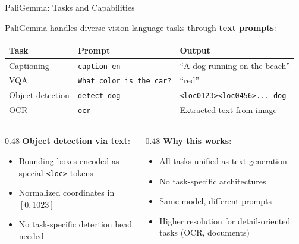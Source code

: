\begin{frame}{PaliGemma: Tasks and Capabilities}

  PaliGemma handles diverse vision-language tasks through \textbf{text prompts}:

  \vspace{0.3em}
  \begin{center}
  \small
  \begin{tabular}{l l l}
    \toprule
    \textbf{Task} & \textbf{Prompt} & \textbf{Output} \\
    \midrule
    Captioning & \texttt{caption en} & ``A dog running on the beach'' \\
    VQA & \texttt{What color is the car?} & ``red'' \\
    Object detection & \texttt{detect dog} & \texttt{<loc0123><loc0456>...~dog} \\
    OCR & \texttt{ocr} & Extracted text from image \\
    \bottomrule
  \end{tabular}
  \end{center}

  \vspace{0.5em}
  \begin{columns}
    \begin{column}{0.48\textwidth}
      \textbf{Object detection via text}:
      \begin{itemize}
        \item Bounding boxes encoded as special \texttt{<loc>} tokens
        \item Normalized coordinates in $[0, 1023]$
        \item No task-specific detection head needed
      \end{itemize}
    \end{column}
    \begin{column}{0.48\textwidth}
      \textbf{Why this works}:
      \begin{itemize}
        \item All tasks unified as text generation
        \item No task-specific architectures
        \item Same model, different prompts
        \item Higher resolution for detail-oriented tasks (OCR, documents)
      \end{itemize}
    \end{column}
  \end{columns}
\end{frame}

